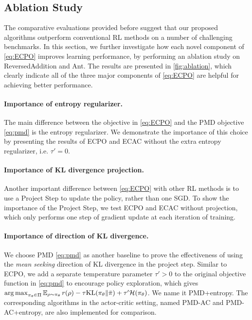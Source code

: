 
\subsection{Ablation Study}
\label{subsec:ablationstudy}

The comparative evaluations provided before suggest 
that our proposed algorithms 
outperform conventional RL methods on a number of challenging benchmarks.
In this section, we further investigate how each novel component of
\cref{eq:ECPO} improves learning performance,
by performing an ablation study on ReversedAddition and Ant. The results are presented in \cref{fig:ablation},
which clearly indicate all of the three major components of \cref{eq:ECPO}
are helpful for achieving better performance. 


\paragraph{Importance of entropy regularizer.} The main difference between the objective in \cref{eq:ECPO} and the PMD
objective \cref{eq:pmd} is the entropy regularizer.
We demonstrate the importance of this choice by presenting the results of ECPO and ECAC without the extra entropy regularizer, i.e. $\tau'=0$.

\paragraph{Importance of KL divergence projection.} Another important difference between \cref{eq:ECPO} with other RL methods
is to use a Project Step to update the policy,
rather than one SGD.
To show the importance of the Project Step,
we test ECPO and ECAC without projection,
which only performs one step of gradient update at each iteration of training. 

\paragraph{Importance of direction of KL divergence.} We choose PMD \cref{eq:pmd} as another baseline
to prove the effectiveness of using the \emph{mean seeking}
direction of KL divergence in the project step.
Similar to ECPO, we add a separate temperature parameter $\tau' > 0$
to the original objective function in \cref{eq:pmd}
to encourage policy exploration,
which gives
$\operatorname*{arg\,max}_{\pi_\theta \in \Pi}{ \operatorname*{\mathbb{E}}_{\rho \sim \pi_\theta}{  r(\rho)  - \tau \text{KL}(\pi_\theta \| \bar{\pi}) } + \tau'\mathcal{H}(\pi_\theta) }$.
We name it PMD+entropy.
The corresponding algorithms in the actor-critic setting,
named PMD-AC and PMD-AC+entropy, are also implemented for comparison.

